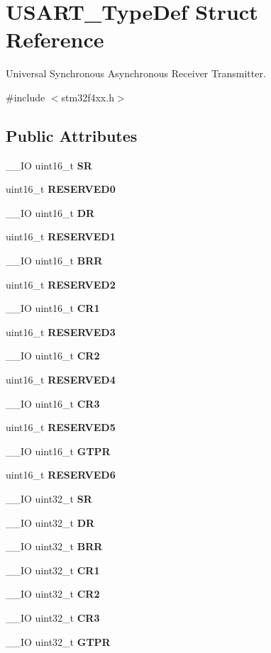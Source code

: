 \section{U\+S\+A\+R\+T\+\_\+\+Type\+Def Struct Reference}
\label{structUSART__TypeDef}


Universal Synchronous Asynchronous Receiver Transmitter.  




{\ttfamily \#include $<$stm32f4xx.\+h$>$}

\subsection*{Public Attributes}
\begin{DoxyCompactItemize}
\item 
\+\_\+\+\_\+\+IO uint16\+\_\+t \textbf{ SR}
\item 
uint16\+\_\+t \textbf{ R\+E\+S\+E\+R\+V\+E\+D0}
\item 
\+\_\+\+\_\+\+IO uint16\+\_\+t \textbf{ DR}
\item 
uint16\+\_\+t \textbf{ R\+E\+S\+E\+R\+V\+E\+D1}
\item 
\+\_\+\+\_\+\+IO uint16\+\_\+t \textbf{ B\+RR}
\item 
uint16\+\_\+t \textbf{ R\+E\+S\+E\+R\+V\+E\+D2}
\item 
\+\_\+\+\_\+\+IO uint16\+\_\+t \textbf{ C\+R1}
\item 
uint16\+\_\+t \textbf{ R\+E\+S\+E\+R\+V\+E\+D3}
\item 
\+\_\+\+\_\+\+IO uint16\+\_\+t \textbf{ C\+R2}
\item 
uint16\+\_\+t \textbf{ R\+E\+S\+E\+R\+V\+E\+D4}
\item 
\+\_\+\+\_\+\+IO uint16\+\_\+t \textbf{ C\+R3}
\item 
uint16\+\_\+t \textbf{ R\+E\+S\+E\+R\+V\+E\+D5}
\item 
\+\_\+\+\_\+\+IO uint16\+\_\+t \textbf{ G\+T\+PR}
\item 
uint16\+\_\+t \textbf{ R\+E\+S\+E\+R\+V\+E\+D6}
\item 
\+\_\+\+\_\+\+IO uint32\+\_\+t \textbf{ SR}
\item 
\+\_\+\+\_\+\+IO uint32\+\_\+t \textbf{ DR}
\item 
\+\_\+\+\_\+\+IO uint32\+\_\+t \textbf{ B\+RR}
\item 
\+\_\+\+\_\+\+IO uint32\+\_\+t \textbf{ C\+R1}
\item 
\+\_\+\+\_\+\+IO uint32\+\_\+t \textbf{ C\+R2}
\item 
\+\_\+\+\_\+\+IO uint32\+\_\+t \textbf{ C\+R3}
\item 
\+\_\+\+\_\+\+IO uint32\+\_\+t \textbf{ G\+T\+PR}
\end{DoxyCompactItemize}


